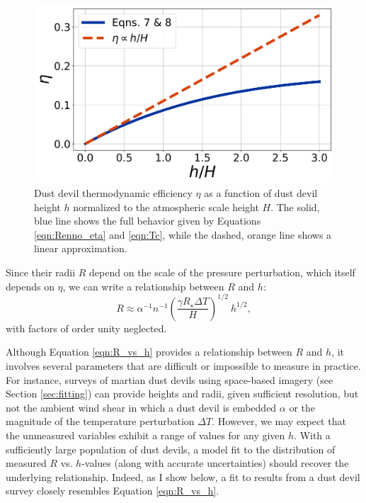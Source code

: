 \documentclass{aastex63}
\begin{document}
\begin{figure}
    \centering
    \includegraphics[width=\textwidth]{eta_vs_h-over-H.png}
    \caption{Dust devil thermodynamic efficiency $\eta$ as a function of dust devil height $h$ normalized to the atmospheric scale height $H$. The solid, blue line shows the full behavior given by Equations \ref{eqn:Renno_eta} and \ref{eqn:Tc}, while the dashed, orange line shows a linear approximation.}
    \label{fig:eta_vs_h-over-H}
\end{figure}

Since their radii $R$ depend on the scale of the pressure perturbation, which itself depends on $\eta$, we can write a relationship between $R$ and $h$:
\begin{equation}
    R \approx \alpha^{-1} n^{-1} \left( \dfrac{\gamma R_\star \Delta T}{H} \right)^{1/2}\ h^{1/2},\label{eqn:R_vs_h}
\end{equation}
with factors of order unity neglected.


Although Equation \ref{eqn:R_vs_h} provides a relationship between $R$ and $h$, it involves several parameters that are difficult or impossible to measure in practice. For instance, surveys of martian dust devils using space-based imagery (see Section \ref{sec:fitting}) can provide heights and radii, given sufficient resolution, but not the ambient wind shear in which a dust devil is embedded $\alpha$ or the magnitude of the temperature perturbation $\Delta T$. However, we may expect that the unmeasured variables exhibit a range of values for any given $h$. With a sufficiently large population of dust devils, a model fit to the distribution of measured $R$ vs. $h$-values (along with accurate uncertainties) should recover the underlying relationship. Indeed, as I show below, a fit to results from a dust devil survey closely resembles Equation \ref{eqn:R_vs_h}.
\end{document}
